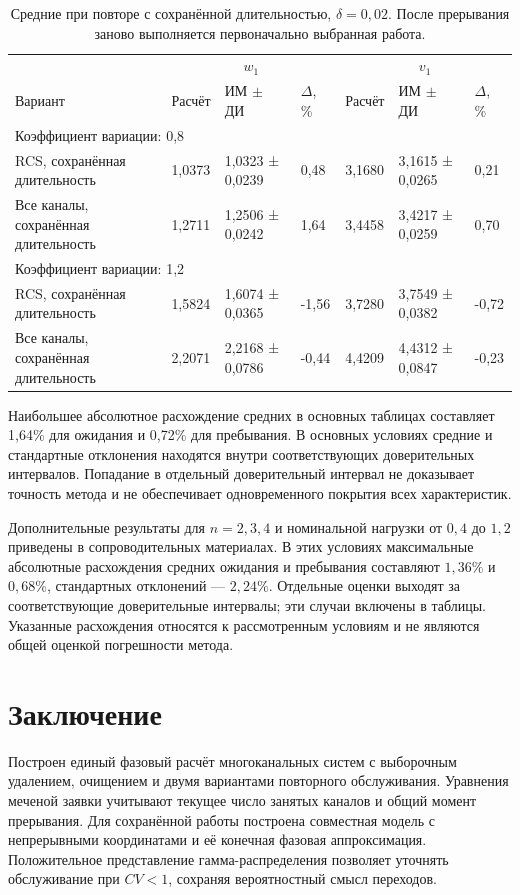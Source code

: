 \documentclass[a4paper,12pt]{article}
\begin{document}
\begin{table}[!htbp]
\centering\small\setlength{\tabcolsep}{2pt}
\begin{tabular}{@{}p{4.16cm}p{1.61cm}p{2.83cm}p{1.28cm}p{1.61cm}p{2.83cm}p{1.28cm}@{}}
\toprule
 & \multicolumn{3}{c}{$w_1$} & \multicolumn{3}{c}{$v_1$} \\
Вариант & Расчёт & ИМ $\pm$ ДИ & $\Delta$, \% & Расчёт & ИМ $\pm$ ДИ & $\Delta$, \% \\
\midrule
\multicolumn{7}{l}{Коэффициент вариации: 0,8} \\
RCS, сохранённая длительность & 1,0373 & 1,0323 ± 0,0239 & 0,48 & 3,1680 & 3,1615 ± 0,0265 & 0,21 \\
Все каналы, сохранённая длительность & 1,2711 & 1,2506 ± 0,0242 & 1,64 & 3,4458 & 3,4217 ± 0,0259 & 0,70 \\
\multicolumn{7}{l}{Коэффициент вариации: 1,2} \\
RCS, сохранённая длительность & 1,5824 & 1,6074 ± 0,0365 & -1,56 & 3,7280 & 3,7549 ± 0,0382 & -0,72 \\
Все каналы, сохранённая длительность & 2,2071 & 2,2168 ± 0,0786 & -0,44 & 4,4209 & 4,4312 ± 0,0847 & -0,23 \\
\bottomrule
\end{tabular}
\caption{Средние при повторе с сохранённой длительностью, $\delta=0{,}02$. После прерывания заново выполняется первоначально выбранная работа.}
\label{tab:results_fixed}
\end{table}

Наибольшее абсолютное расхождение средних в основных таблицах составляет 1,64\% для ожидания и 0,72\% для пребывания. В основных условиях средние и стандартные отклонения находятся внутри соответствующих доверительных интервалов. Попадание в отдельный доверительный интервал не доказывает точность метода и не обеспечивает одновременного покрытия всех характеристик.

Дополнительные результаты для \(n=2,3,4\) и номинальной нагрузки от \(0{,}4\) до \(1{,}2\) приведены в сопроводительных материалах. В этих условиях максимальные абсолютные расхождения средних ожидания и пребывания составляют \(1{,}36\%\) и \(0{,}68\%\), стандартных отклонений --- \(2{,}24\%\). Отдельные оценки выходят за соответствующие доверительные интервалы; эти случаи включены в таблицы. Указанные расхождения относятся к рассмотренным условиям и не являются общей оценкой погрешности метода.

\section{Заключение}
Построен единый фазовый расчёт многоканальных систем с выборочным удалением, очищением и двумя вариантами повторного обслуживания. Уравнения меченой заявки учитывают текущее число занятых каналов и общий момент прерывания. Для сохранённой работы построена совместная модель с непрерывными координатами и её конечная фазовая аппроксимация. Положительное представление гамма-распределения позволяет уточнять обслуживание при \(CV<1\), сохраняя вероятностный смысл переходов.
\end{document}
